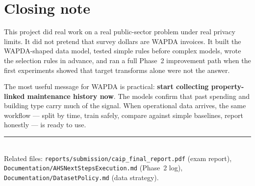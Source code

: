 \documentclass[11pt,a4paper]{article}
\begin{document}
\section{Closing note}

This project did real work on a real public-sector problem under real privacy limits. It did not pretend that survey dollars are WAPDA invoices. It built the WAPDA-shaped data model, tested simple rules before complex models, wrote the selection rules in advance, and ran a full Phase~2 improvement path when the first experiments showed that target transforms alone were not the answer.

The most useful message for WAPDA is practical: \textbf{start collecting property-linked maintenance history now}. The models confirm that past spending and building type carry much of the signal. When operational data arrives, the same workflow --- split by time, train safely, compare against simple baselines, report honestly --- is ready to use.

\vspace{0.5em}
\noindent\rule{\textwidth}{0.4pt}\\
{\small Related files: \texttt{reports/submission/caip\_final\_report.pdf} (exam report),
\texttt{Documentation/AHSNextStepsExecution.md} (Phase~2 log),
\texttt{Documentation/DatasetPolicy.md} (data strategy).}
\end{document}
